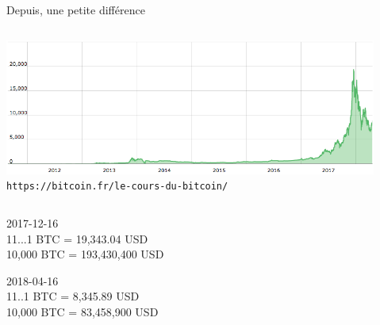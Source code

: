 

\begin{frame}{\vskip -0.1cm\Large Depuis, une petite diff\'erence}

\begin{columns}
\column{\dimexpr\paperwidth-1pt}

\begin{center}
\vskip -0.2cm
\includegraphics[width=12.25cm]{graphics/bitcoin-price-chart-fr.png}
\vskip -0.1cm
{\tiny\texttt{https://bitcoin.fr/le-cours-du-bitcoin/}}%

\end{center}

\end{columns}

\vskip 0.5cm

\begin{multicols}{2}

	\begin{center}
	{\footnotesize 2017-12-16 \\
	\normalsize{\color{white}11...}1 BTC = 19,343.04 USD \\
	\footnotesize 10,000 BTC = 193,430,400 USD}
	\end{center}

\columnbreak

	\begin{center}
	{\footnotesize 2018-04-16 \\
	\normalsize{\color{white}11..}1 BTC = 8,345.89 USD \\
	\footnotesize 10,000 BTC = 83,458,900 USD}
	\end{center}

\end{multicols}

\normalsize
\end{frame}


